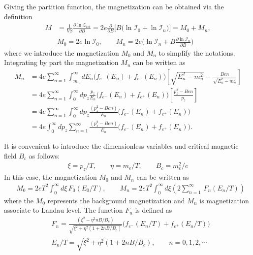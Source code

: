\documentclass[sn-mathphys,Numbered]{sn-jnl}
\begin{document}
Giving the partition function, the magnetization can be obtained via the definition
\begin{align}
M&=\frac{1}{V\beta}\frac{\partial \ln \mathcal{Z}_{tot}}{\partial B}=2e\frac{\partial}{\partial B}\bigg[B\bigg(\ln\mathcal{I}_{0}+\ln\mathcal{I}_{n}\bigg)\bigg]=M_0+M_n,\\
&M_0=2e\ln\mathcal{I}_{0},\qquad
\label{M_landau}
M_n=2e\bigg(\ln\mathcal{I}_{n}+B\frac{\partial\ln\mathcal{I}_n}{\partial B}\bigg)
\end{align}
where we introduce the magnetization $M_0$ and $M_n$ to simplify the notations. 
Integrating by part the magnetization $M_n$ can be written as
\begin{align}
M_n&=4e\sum_{n=1}^\infty \int_{m_n}^\infty\!\!dE_n\bigg(f_{e^-}(E_n)+f_{e^+}(E_n)\bigg)\left[{\sqrt{E^2_n-m^2_n}}-\frac{Ben}{\sqrt{E^2_n-m^2_n}}\right]\\
&=4e\sum_{n=1}^\infty \int_{0}^\infty\!\!dp_z\frac{p_z}{E_n}\bigg(f_{e^-}(E_n)+f_{e^+}(E_n)\bigg)\left[\frac{p_z^2-Ben}{p_z}\right]\\
&=4e\sum_{n=1}^\infty \int_{0}^\infty\!\!dp_z\frac{(p_z^2-Ben)}{E_n}\bigg(f_{e^-}(E_n)+f_{e^+}(E_n)\bigg)\\
&=4e \int_{0}^\infty\!\!dp_z\sum_{n=1}^\infty\frac{(p_z^2-Ben)}{E_n}\bigg(f_{e^-}(E_n)+f_{e^+}(E_n)\bigg).
\end{align}

It is convenient to introduce the dimensionless variables and critical magnetic field $B_c$ as follows:
\begin{align}
\xi=p_z/T,\qquad \eta=m_e/T,\qquad B_c=m^2_e/e
\end{align}
In this case, the magnetization $M_0$ and $M_n$ can be written as
\begin{align}
&M_0=2eT^2\int_0^\infty\!\!d\xi\, F_0(E_0/T),\qquad M_n=2eT^2\int_{0}^\infty\!\!d\xi\left(2\sum_{n=1}^\infty\,F_n(E_n/T)\right)
\end{align}
where the $M_0$ represents the background magnetization  and $M_n$ is magnetization associate to Landau level. The function $F_n$ is defined as
\begin{align}
&F_n=\frac{(\xi^2-\eta^2nB/B_c)}{\sqrt{\xi^2+\eta^2\left(1+2nB/B_c\right)}}\bigg(f_{e^-}(E_n/T)+f_{e^+}(E_n/T)\bigg)\\
&E_n/T=\sqrt{\xi^2+\eta^2\left(1+2nB/B_c\right)},\qquad n=0,1,2,\cdots
\end{align}
\end{document}
